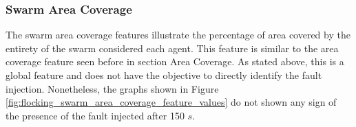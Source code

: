 \documentclass[../../Thesis.tex]{subfiles}
\begin{document}
			\subsubsection{Swarm Area Coverage}
				The swarm area coverage features illustrate the percentage of area covered by the entirety of the swarm considered each agent. This feature is similar to the area coverage feature seen before in section Area Coverage. As stated above, this is a global feature and does not have the objective to directly identify the fault injection. Nonetheless, the graphs shown in Figure \ref{fig:flocking_swarm_area_coverage_feature_values} do not shown any sign of the presence of the fault injected after 150 $s$.
				\begin{figure}
					\centering
					\quad
\end{figure}
\end{document}
